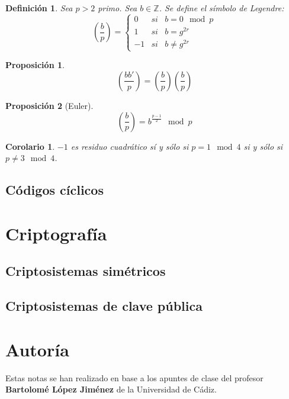 \documentclass[spanish]{book}
\newtheorem{mydef}{Definición}
\newtheorem{coro}{Corolario}
\newtheorem{proposi}{Proposición}
\begin{document}
\begin{mydef}
	Sea $p>2$ primo. Sea $b \in \mathbb{Z}$. Se define el símbolo de Legendre:
	$$\left( \frac{b}{p} \right)=\left\{\begin{array}{ccc}
	0 & si & b=0 \mod p \\
	1 & si & b=g^{2r} \\
	-1 & si & b \neq g^{2r}
	\end{array}
	\right.
	$$
\end{mydef}

\begin{proposi}
	$$\left(\frac{bb'}{p}\right)=\left(\frac{b}{p}\right)\left(\frac{b}{p}\right)$$
\end{proposi}

\begin{proposi}[Euler]
	$$\left(\frac{b}{p}\right)=b^{\displaystyle \frac{p-1}{2}} \mod p$$
\end{proposi}


\begin{coro}
	$-1$ es residuo cuadrático sí y sólo si $p=1 \mod 4$ si y sólo si $p\neq 3 \mod 4$.
\end{coro}
\section{Códigos cíclicos}

\chapter{Criptografía}
\section{Criptosistemas simétricos}
\section{Criptosistemas de clave pública}

\chapter*{Autoría}
Estas notas se han realizado en base a los apuntes de clase del profesor \textbf{Bartolomé López Jiménez} de la Universidad de Cádiz.
\end{document}
